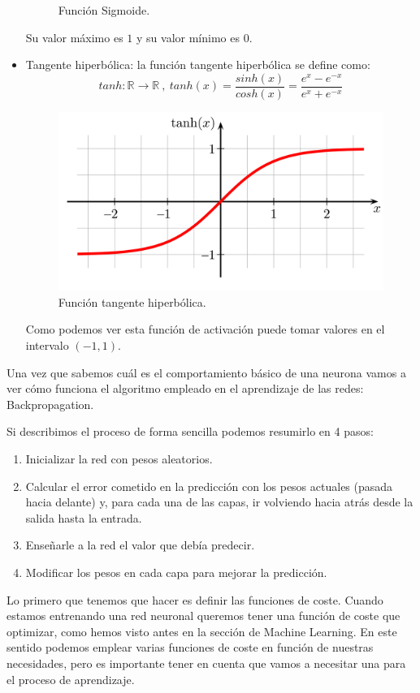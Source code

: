 \begin{itemize}
\begin{figure}[H]
		\caption{Función Sigmoide.}
		\label{img:sigmoide}
	\end{figure}
	Su valor máximo es $1$ y su valor mínimo es $0$.
	\item Tangente hiperbólica: la función tangente hiperbólica se define como:
	$$tanh : \mathbb{R}\rightarrow \mathbb{R} \ , \ tanh(x) = \frac{sinh(x)}{cosh(x)} = \frac{e^x - e^{-x}}{e^x + e^{-x}}$$
	\begin{figure}[H]
		\centering
		\includegraphics[scale=0.15]{imagenes/tangente_hiperbolica.png}
		\caption{Función tangente hiperbólica.}
		\label{img:tanh}
	\end{figure}
	Como podemos ver esta función de activación puede tomar valores en el intervalo $(-1,1)$.
\end{itemize}

Una vez que sabemos cuál es el comportamiento básico de una neurona vamos a ver cómo funciona el algoritmo empleado en el aprendizaje de las redes: Backpropagation.

Si describimos el proceso de forma sencilla podemos resumirlo en 4 pasos:

\begin{enumerate}
	\item Inicializar la red con pesos aleatorios.
	\item Calcular el error cometido en la predicción con los pesos actuales (pasada hacia delante) y, para cada una de las capas, ir volviendo hacia atrás desde la salida hasta la entrada.
	\item Enseñarle a la red el valor que debía predecir.
	\item Modificar los pesos en cada capa para mejorar la predicción.
\end{enumerate}

Lo primero que tenemos que hacer es definir las funciones de coste. Cuando estamos entrenando una red neuronal queremos tener una función de coste que optimizar, como hemos visto antes en la sección de Machine Learning. En este sentido podemos emplear varias funciones de coste en función de nuestras necesidades, pero es importante tener en cuenta que vamos a necesitar una para el proceso de aprendizaje.

